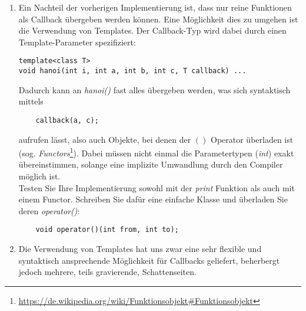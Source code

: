 \documentclass[
  accentcolor=tud1c,	%
  colorbacktitle,		%
  inverttitle,			%
  german,				%
  twoside
]{tudexercise}
\begin{document}
\begin{enumerate}
\begin{lstlisting}
void hanoi(int i, int a, int b, int c, void(*callback)(int from, int to)) {
	...
	callback(a, c);
	...
}
\end{lstlisting}

Nun können Sie eine Funktion mit zwei Parametern an \emph{hanoi()} übergeben.
\begin{lstlisting}
void print(int from, int to) {
	cout << from << " -> " << to << endl;
}
...
hanoi(3, 1, 2, 3, print);
\end{lstlisting}

\item
Ein Nachteil der vorherigen Implementierung ist, dass nur reine Funktionen als Callback übergeben werden können.  Eine Möglichkeit dies zu umgehen ist die Verwendung von Templates. Der Callback-Typ wird dabei durch einen Template-Parameter spezifiziert:
\begin{lstlisting}
template<class T>
void hanoi(int i, int a, int b, int c, T callback) ...
\end{lstlisting}

Dadurch kann an \emph{hanoi()} fast alles übergeben werden, was sich syntaktisch mittels
\begin{lstlisting}
	callback(a, c);
\end{lstlisting}
aufrufen lässt, also auch Objekte, bei denen der $()$ Operator überladen ist (sog. \emph{Functors}\footnote{\url{https://de.wikipedia.org/wiki/Funktionsobjekt\#Funktionsobjekt}}). Dabei müssen nicht einmal die Parametertypen (\emph{int}) exakt übereinstimmen, solange eine implizite Umwandlung durch den Compiler möglich ist. \\

Testen Sie Ihre Implementierung sowohl mit der \emph{print} Funktion als auch mit einem Functor. Schreiben Sie dafür eine einfache Klasse und überladen Sie deren \emph{operator()}:
\begin{lstlisting}
	void operator()(int from, int to);
\end{lstlisting}

\item Die Verwendung von Templates hat uns zwar eine sehr flexible und syntaktisch ansprechende Möglichkeit für Callbacks geliefert, beherbergt jedoch mehrere, teils gravierende, Schattenseiten. \\


\end{enumerate}
\end{document}
